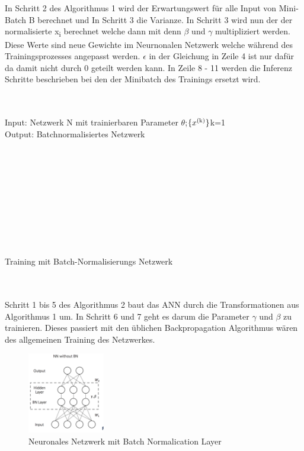 \documentclass{llncs}
\begin{document}
~\\\\
In Schritt 2 des Algorithmus 1 wird der Erwartungswert für alle Input von Mini-Batch B berechnet und In Schritt 3 die Varianze. In Schritt 3 wird nun der der normalisierte x\textsubscript{i} berechnet welche dann mit denn $\beta$ und $\gamma$ multipliziert werden. Diese Werte sind neue Gewichte im Neurnonalen Netzwerk welche während des Trainingsprozesses angepasst werden. $\epsilon$ in der Gleichung in Zeile 4 ist nur dafür da damit nicht durch 0 geteilt werden kann. In Zeile 8 - 11 werden die Inferenz Schritte beschrieben bei den der Minibatch des Trainings ersetzt wird. 
~\\\\\
\begin{algorithm}[H]
	Input: Netzwerk N mit trainierbaren Parameter $\theta$;$\{x\textsuperscript{(k)}\}$k=1\\
	Output: Batchnormalisiertes Netzwerk 	\\
	~\\
	~\\	
	~\\
	~\\
	~\\
	~\\
	~\\
	~\\
	~\\
	~\\
	
	\caption{Training mit Batch-Normalisierungs Netzwerk}	
\end{algorithm}
~\\\\
Schritt 1 bis 5 des Algorithmus 2 baut das ANN durch die Transformationen aus Algorithmus 1 um. In Schritt 6 und 7 geht es darum die Parameter $\gamma$ und $\beta$ zu trainieren. Dieses passiert mit den üblichen Backpropagation Algorithmus wären des allgemeinen Training des Netzwerkes. 

\begin{figure}[htbp] 
	\centering
	\includegraphics[width=0.3\textwidth]{batchnorm.png}
	\caption[aaaa]{Neuronales Netzwerk mit Batch Normalication Layer}
	\label{fig:Bild8}
\end{figure}
\end{document}

